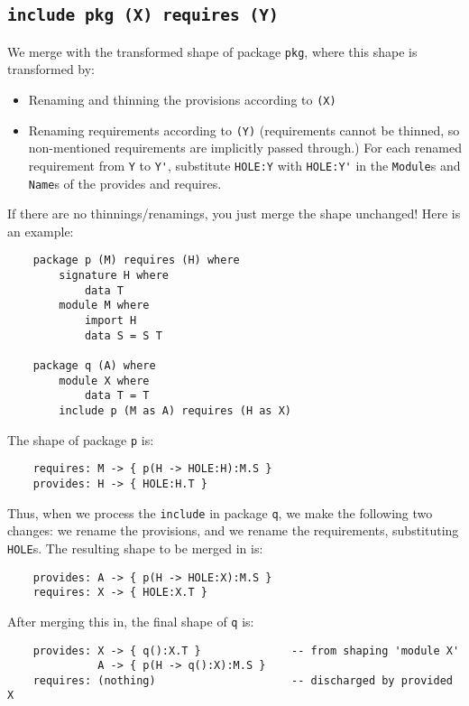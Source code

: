 \documentclass{article}
\begin{document}
\newpage
\subsection{\texttt{include pkg (X) requires (Y)}}

We merge with the transformed shape of package \verb|pkg|, where this
shape is transformed by:

\begin{itemize}
    \item Renaming and thinning the provisions according to \verb|(X)|
    \item Renaming requirements according to \verb|(Y)| (requirements cannot
          be thinned, so non-mentioned requirements are implicitly passed through.)
          For each renamed requirement from \verb|Y| to \verb|Y'|,
          substitute \verb|HOLE:Y| with \verb|HOLE:Y'| in the
          \verb|Module|s and \verb|Name|s of the provides and requires.
\end{itemize}
%
If there are no thinnings/renamings, you just merge the
shape unchanged! Here is an example:

\begin{verbatim}
    package p (M) requires (H) where
        signature H where
            data T
        module M where
            import H
            data S = S T

    package q (A) where
        module X where
            data T = T
        include p (M as A) requires (H as X)
\end{verbatim}
%
The shape of package \verb|p| is:

\begin{verbatim}
    requires: M -> { p(H -> HOLE:H):M.S }
    provides: H -> { HOLE:H.T }
\end{verbatim}
%
Thus, when we process the \verb|include| in package \verb|q|,
we make the following two changes: we rename the provisions,
and we rename the requirements, substituting \verb|HOLE|s.
The resulting shape to be merged in is:

\begin{verbatim}
    provides: A -> { p(H -> HOLE:X):M.S }
    requires: X -> { HOLE:X.T }
\end{verbatim}
%
After merging this in, the final shape of \verb|q| is:

\begin{verbatim}
    provides: X -> { q():X.T }              -- from shaping 'module X'
              A -> { p(H -> q():X):M.S }
    requires: (nothing)                     -- discharged by provided X
\end{verbatim}
\end{document}
